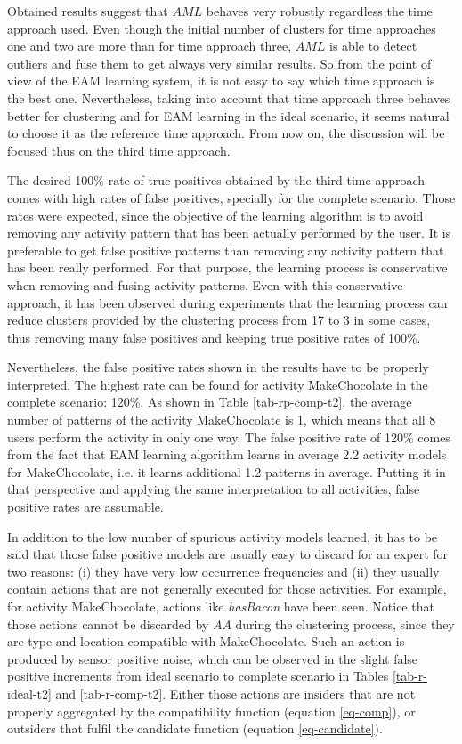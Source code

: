 Obtained results suggest that $AML$ behaves very robustly regardless the time approach used. Even though the initial number of clusters for time approaches one and two are more than for time approach three, $AML$ is able to detect outliers and fuse them to get always very similar results. So from the point of view of the EAM learning system, it is not easy to say which time approach is the best one. Nevertheless, taking into account that time approach three behaves better for clustering and for EAM learning in the ideal scenario, it seems natural to choose it as the reference time approach. From now on, the discussion will be focused thus on the third time approach.

The desired 100\% rate of true positives obtained by the third time approach comes with high rates of false positives, specially for the complete scenario. Those rates were expected, since the objective of the learning algorithm is to avoid removing any activity pattern that has been actually performed by the user. It is preferable to get false positive patterns than removing any activity pattern that has been really performed. For that purpose, the learning process is conservative when removing and fusing activity patterns. Even with this conservative approach, it has been observed during experiments that the learning process can reduce clusters provided by the clustering process from 17 to 3 in some cases, thus removing many false positives and keeping true positive rates of 100\%. 

Nevertheless, the false positive rates shown in the results have to be properly interpreted. The highest rate can be found for activity MakeChocolate in the complete scenario: 120\%. As shown in Table \ref{tab-rp-comp-t2}, the average number of patterns of the activity MakeChocolate is 1, which means that all 8 users perform the activity in only one way. The false positive rate of 120\% comes from the fact that EAM learning algorithm learns in average 2.2 activity models for MakeChocolate, i.e. it learns additional 1.2 patterns in average. Putting it in that perspective and applying the same interpretation to all activities, false positive rates are assumable.

In addition to the low number of spurious activity models learned, it has to be said that those false positive models are usually easy to discard for an expert for two reasons: (i) they have very low occurrence frequencies and (ii) they usually contain actions that are not generally executed for those activities. For example, for activity MakeChocolate, actions like \textit{hasBacon} have been seen. Notice that those actions cannot be discarded by $AA$ during the clustering process, since they are type and location compatible with MakeChocolate. Such an action is produced by sensor positive noise, which can be observed in the slight false positive increments from ideal scenario to complete scenario in Tables \ref{tab-r-ideal-t2} and \ref{tab-r-comp-t2}. Either those actions are insiders that are not properly aggregated by the compatibility function (equation \ref{eq-comp}), or outsiders that fulfil the candidate function (equation \ref{eq-candidate}). 

